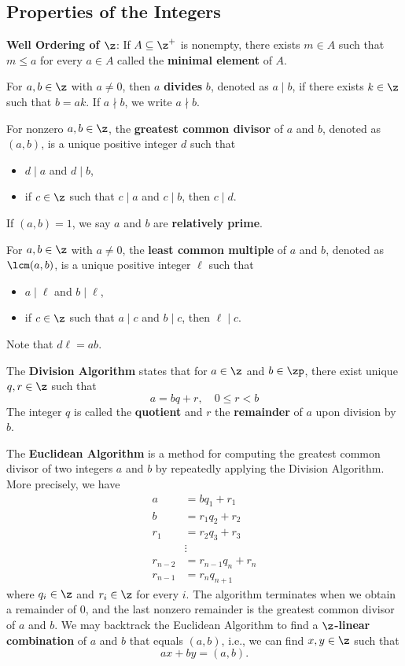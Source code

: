 \newpage

\subsection{Properties of the Integers} \label{sec0.2}

 \textbf{Well Ordering of $\z$}: If $A \subseteq \z^+$ is nonempty, there exists $m \in A$ such that $m \leq a$ for every $a \in A$ called the \textbf{minimal element} of $A$.

 For $a, b \in \z$ with $a \neq 0$, then $a$ \textbf{divides} $b$, denoted as $a \mid b$, if there exists $k \in \z$ such that $b = ak$. If $a \nmid b$, we write $a \nmid b$.

 For nonzero $a, b \in \z$, the \textbf{greatest common divisor} of $a$ and $b$, denoted as $(a, b)$, is a unique positive integer $d$ such that
\begin{itemize}
    \item $d \mid a$ and $d \mid b$,
    \item if $c \in \z$ such that $c \mid a$ and $c \mid b$, then $c \mid d$.
\end{itemize}
If $(a, b) = 1$, we say $a$ and $b$ are \textbf{relatively prime}.

 For $a, b \in \z$ with $a \neq 0$, the \textbf{least common multiple} of $a$ and $b$, denoted as $\lcm(a, b)$, is a unique positive integer $\ell$ such that
\begin{itemize}
    \item $a \mid \ell$ and $b \mid \ell$,
    \item if $c \in \z$ such that $a \mid c$ and $b \mid c$, then $\ell \mid c$.
\end{itemize}
Note that $d\ell = ab$.

 The \textbf{Division Algorithm} states that for $a \in \z$ and $b \in \zp$, there exist unique $q, r \in \z$ such that
\[a = bq + r, \quad 0 \leq r < b\]
The integer $q$ is called the \textbf{quotient} and $r$ the \textbf{remainder} of $a$ upon division by $b$.

 The \textbf{Euclidean Algorithm} is a method for computing the greatest common divisor of two integers $a$ and $b$ by repeatedly applying the Division Algorithm. More precisely, we have
\begin{align*}
    a & = bq_1 + r_1 \\
    b & = r_1q_2 + r_2 \\
    r_1 & = r_2q_3 + r_3 \\
    & \vdots \\
    r_{n-2} & = r_{n-1}q_n + r_n \\
    r_{n-1} & = r_nq_{n+1}
\end{align*}
where $q_i \in \z$ and $r_i \in \z$ for every $i$. The algorithm terminates when we obtain a remainder of $0$, and the last nonzero remainder is the greatest common divisor of $a$ and $b$. We may backtrack the Euclidean Algorithm to find a \textbf{$\z$-linear combination} of $a$ and $b$ that equals $(a, b)$, i.e., we can find $x, y \in \z$ such that
\[ax + by = (a, b).\]

